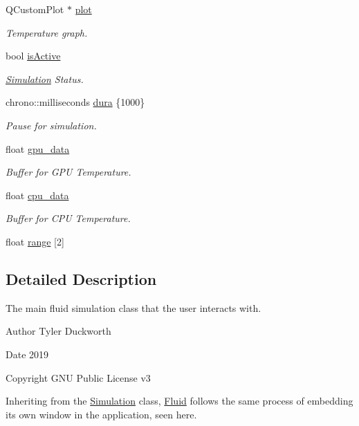 \begin{DoxyCompactItemize}
Q\+Custom\+Plot $\ast$ \mbox{\hyperlink{classSmoke_a5c1910ba7c1f3ae49b5e753d35e9156b}{plot}}
\begin{DoxyCompactList}\small\item\em Temperature graph. \end{DoxyCompactList}\item 
bool \mbox{\hyperlink{classSmoke_a83c338b4ec7a3d71443e8f1fd9d7a1b5}{is\+Active}}
\begin{DoxyCompactList}\small\item\em \mbox{\hyperlink{classSimulation}{Simulation}} Status. \end{DoxyCompactList}\item 
chrono\+::milliseconds \mbox{\hyperlink{classSmoke_ae62660aa3919c7a01b5a0c3ad5ec1715}{dura}} \{1000\}
\begin{DoxyCompactList}\small\item\em Pause for simulation. \end{DoxyCompactList}\item 
float \mbox{\hyperlink{classSmoke_afcd49fb97c3573ec4c779346d4be1c95}{gpu\+\_\+data}}
\begin{DoxyCompactList}\small\item\em Buffer for G\+PU Temperature. \end{DoxyCompactList}\item 
float \mbox{\hyperlink{classSmoke_a27ecb4dc9f91a34bed0637c1743275cb}{cpu\+\_\+data}}
\begin{DoxyCompactList}\small\item\em Buffer for C\+PU Temperature. \end{DoxyCompactList}\item 
float \mbox{\hyperlink{classSmoke_ae27bb310eec891bf0973a263383563a5}{range}} \mbox{[}2\mbox{]}
\end{DoxyCompactItemize}


\subsection{Detailed Description}
The main fluid simulation class that the user interacts with. 

\begin{DoxyAuthor}{Author}
Tyler Duckworth 
\end{DoxyAuthor}
\begin{DoxyDate}{Date}
2019 
\end{DoxyDate}
\begin{DoxyCopyright}{Copyright}
G\+NU Public License v3
\end{DoxyCopyright}
Inheriting from the \mbox{\hyperlink{classSimulation}{Simulation}} class, \mbox{\hyperlink{classFluid}{Fluid}} follows the same process of embedding its own window in the application, seen here.

